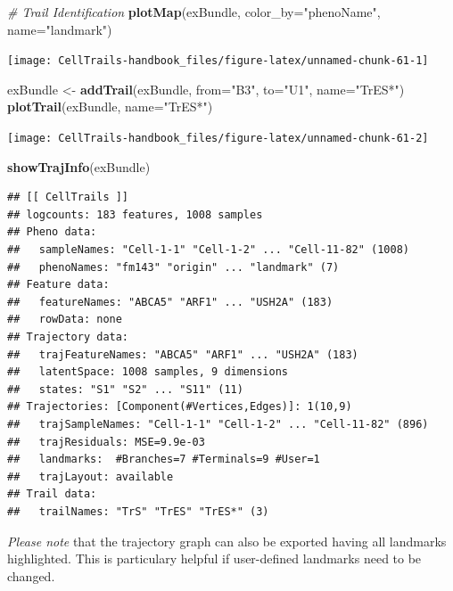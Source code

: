 \documentclass[]{book}
\newenvironment{Shaded}{\begin{snugshade}}{\end{snugshade}}
\newcommand{\KeywordTok}[1]{\textcolor[rgb]{0.13,0.29,0.53}{\textbf{#1}}}
\newcommand{\DataTypeTok}[1]{\textcolor[rgb]{0.13,0.29,0.53}{#1}}
\newcommand{\StringTok}[1]{\textcolor[rgb]{0.31,0.60,0.02}{#1}}
\newcommand{\CommentTok}[1]{\textcolor[rgb]{0.56,0.35,0.01}{\textit{#1}}}
\newcommand{\NormalTok}[1]{#1}
\theoremstyle{definition}
\theoremstyle{definition}
\theoremstyle{definition}
\theoremstyle{remark}
\begin{document}
\begin{Shaded}
\begin{Highlighting}[]
\CommentTok{# Trail Identification}
\KeywordTok{plotMap}\NormalTok{(exBundle, }\DataTypeTok{color_by=}\StringTok{"phenoName"}\NormalTok{, }\DataTypeTok{name=}\StringTok{"landmark"}\NormalTok{)}
\end{Highlighting}
\end{Shaded}

\texttt{[image: CellTrails-handbook\_files/figure-latex/unnamed-chunk-61-1]}

\begin{Shaded}
\begin{Highlighting}[]
\NormalTok{exBundle <-}\StringTok{ }\KeywordTok{addTrail}\NormalTok{(exBundle, }\DataTypeTok{from=}\StringTok{"B3"}\NormalTok{, }\DataTypeTok{to=}\StringTok{"U1"}\NormalTok{, }\DataTypeTok{name=}\StringTok{"TrES*"}\NormalTok{)}
\KeywordTok{plotTrail}\NormalTok{(exBundle, }\DataTypeTok{name=}\StringTok{"TrES*"}\NormalTok{)}
\end{Highlighting}
\end{Shaded}

\texttt{[image: CellTrails-handbook\_files/figure-latex/unnamed-chunk-61-2]}

\begin{Shaded}
\begin{Highlighting}[]
\KeywordTok{showTrajInfo}\NormalTok{(exBundle)}
\end{Highlighting}
\end{Shaded}

\begin{verbatim}
## [[ CellTrails ]] 
## logcounts: 183 features, 1008 samples
## Pheno data: 
##   sampleNames: "Cell-1-1" "Cell-1-2" ... "Cell-11-82" (1008)
##   phenoNames: "fm143" "origin" ... "landmark" (7)
## Feature data: 
##   featureNames: "ABCA5" "ARF1" ... "USH2A" (183)
##   rowData: none
## Trajectory data: 
##   trajFeatureNames: "ABCA5" "ARF1" ... "USH2A" (183)
##   latentSpace: 1008 samples, 9 dimensions
##   states: "S1" "S2" ... "S11" (11)
## Trajectories: [Component(#Vertices,Edges)]: 1(10,9)
##   trajSampleNames: "Cell-1-1" "Cell-1-2" ... "Cell-11-82" (896)
##   trajResiduals: MSE=9.9e-03
##   landmarks:  #Branches=7 #Terminals=9 #User=1
##   trajLayout: available
## Trail data: 
##   trailNames: "TrS" "TrES" "TrES*" (3)
\end{verbatim}

\emph{Please note} that the trajectory graph can also be exported having
all landmarks highlighted. This is particulary helpful if user-defined
landmarks need to be changed.
\end{document}
